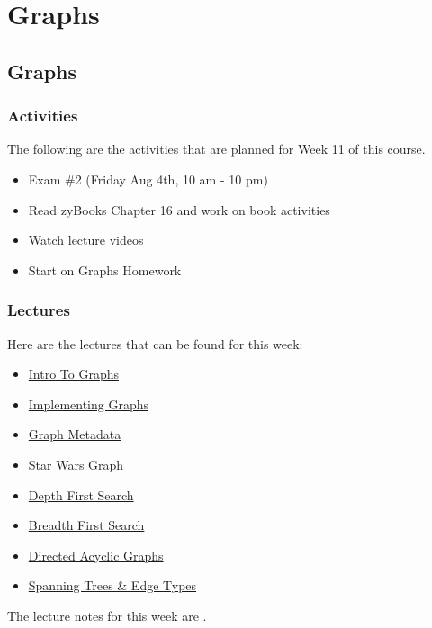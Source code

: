 \clearpage

\renewcommand{\ChapTitle}{Graphs}

\chapter{\ChapTitle}
\section{\ChapTitle}

\subsection{Activities}

The following are the activities that are planned for Week 11 of this course.

\begin{itemize}
    \item Exam \#2 (Friday Aug 4th, 10 am - 10 pm)
    \item Read zyBooks Chapter 16 and work on book activities
    \item Watch lecture videos
    \item Start on Graphs Homework
\end{itemize}

\subsection{Lectures}

Here are the lectures that can be found for this week:

\begin{itemize}
    \item \href{https://applied.cs.colorado.edu/mod/hvp/view.php?id=46043}{Intro To Graphs}
    \item \href{https://applied.cs.colorado.edu/mod/hvp/view.php?id=46044}{Implementing Graphs}
    \item \href{https://applied.cs.colorado.edu/mod/hvp/view.php?id=46045}{Graph Metadata}
    \item \href{https://applied.cs.colorado.edu/mod/hvp/view.php?id=46046}{Star Wars Graph}
    \item \href{https://applied.cs.colorado.edu/mod/hvp/view.php?id=46047}{Depth First Search}
    \item \href{https://applied.cs.colorado.edu/mod/hvp/view.php?id=46048}{Breadth First Search}
    \item \href{https://applied.cs.colorado.edu/mod/hvp/view.php?id=46049}{Directed Acyclic Graphs}
    \item \href{https://applied.cs.colorado.edu/mod/hvp/view.php?id=46050}{Spanning Trees \& Edge Types}
\end{itemize}
The lecture notes for this week are .

